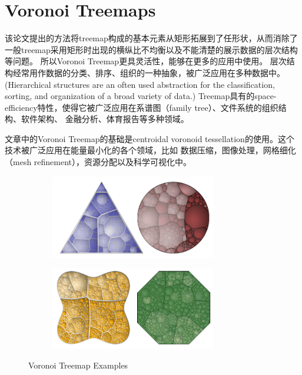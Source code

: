 \documentclass{article}
\begin{document}
\normalem
\section{Voronoi Treemaps\cite{Balzer2005}}
该论文提出的方法将treemap构成的基本元素从矩形拓展到了任形状，从而消除了一般treemap采用矩形时出现的横纵比不均衡以及不能清楚的展示数据的层次结构等问题。
所以Voronoi Treemap更具灵活性，能够在更多的应用中使用。
层次结构经常用作数据的分类、排序、组织的一种抽象，被广泛应用在多种数据中。
(Hierarchical structures are an often used abstraction for the classification, 
sorting, and organization of a broad variety of data.)
Treemap具有的space-efficiency特性，使得它被广泛应用在系谱图（family tree）、文件系统的组织结构、软件架构、
金融分析、体育报告等多种领域。

文章中的Voronoi Treemap的基础是centroidal voronoid tessellation\cite{du1999centroidal}的使用。这个技术被广泛应用在能量最小化的各个领域，比如
数据压缩，图像处理，网格细化（mesh refinement），资源分配以及科学可视化中。
\begin{figure}
  \centering
  \begin{subfigure}[h]{0.5\textwidth}
    \includegraphics[width=0.8\textwidth]{_img/VoronoiTreemap_1.png}
    \label{fig:voronoi_treemap_1}
  \end{subfigure}

  \begin{subfigure}[h]{0.5\textwidth}
    \includegraphics[width=0.8\textwidth]{_img/VoronoiTreemap_2.png}
    \label{fig:voronoi_treemap_1}
  \end{subfigure}
  \caption{Voronoi Treemap Examples}
\end{figure}
\end{document}
